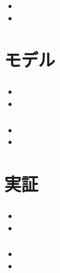 \documentclass[dvipdfmx, 12pt]{beamer}
\begin{document}
\begin{frame}\frametitle{}
	\begin{itemize}
		\item 
		\item 
	\end{itemize}
\end{frame}


\section{モデル}
\begin{frame}\frametitle{}
	\begin{itemize}
		\item 
		\item 
	\end{itemize}
\end{frame}

\begin{frame}\frametitle{}
	\begin{itemize}
		\item 
		\item 
	\end{itemize}
\end{frame}

\section{実証}
\begin{frame}\frametitle{}
	\begin{itemize}
		\item 
		\item 
	\end{itemize}
\end{frame}

\begin{frame}\frametitle{}
	\begin{itemize}
		\item 
		\item 
	\end{itemize}
\end{frame}
\end{document}
